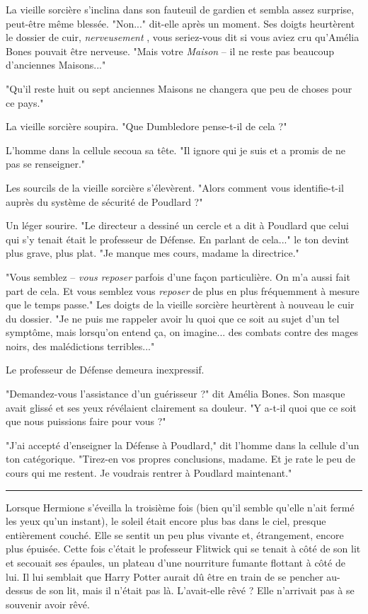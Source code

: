 La vieille sorcière s'inclina dans son fauteuil de gardien et sembla assez surprise, peut-être même blessée. "Non..." dit-elle après un moment. Ses doigts heurtèrent le dossier de cuir, \emph{nerveusement} , vous seriez-vous dit si vous aviez cru qu'Amélia Bones pouvait être nerveuse. "Mais votre \emph{Maison}  – il ne reste pas beaucoup d'anciennes Maisons..."

"Qu'il reste huit ou sept anciennes Maisons ne changera que peu de choses pour ce pays."

La vieille sorcière soupira. "Que Dumbledore pense-t-il de cela ?"

L'homme dans la cellule secoua sa tête. "Il ignore qui je suis et a promis de ne pas se renseigner."

Les sourcils de la vieille sorcière s'élevèrent. "Alors comment vous identifie-t-il auprès du système de sécurité de Poudlard ?"

Un léger sourire. "Le directeur a dessiné un cercle et a dit à Poudlard que celui qui s'y tenait était le professeur de Défense. En parlant de cela..." le ton devint plus grave, plus plat. "Je manque mes cours, madame la directrice."

"Vous semblez – \emph{vous reposer}  parfois d'une façon particulière. On m'a aussi fait part de cela. Et vous semblez vous \emph{reposer}  de plus en plus fréquemment à mesure que le temps passe." Les doigts de la vieille sorcière heurtèrent à nouveau le cuir du dossier. "Je ne puis me rappeler avoir lu quoi que ce soit au sujet d'un tel symptôme, mais lorsqu'on entend ça, on imagine... des combats contre des mages noirs, des malédictions terribles..."

Le professeur de Défense demeura inexpressif.

"Demandez-vous l'assistance d'un guérisseur ?" dit Amélia Bones. Son masque avait glissé et ses yeux révélaient clairement sa douleur. "Y a-t-il quoi que ce soit que nous puissions faire pour vous ?"

"J'ai accepté d'enseigner la Défense à Poudlard," dit l'homme dans la cellule d'un ton catégorique. "Tirez-en vos propres conclusions, madame. Et je rate le peu de cours qui me restent. Je voudrais rentrer à Poudlard maintenant."
\par\noindent\rule{\textwidth}{0.4pt}
Lorsque Hermione s'éveilla la troisième fois (bien qu'il semble qu'elle n'ait fermé les yeux qu'un instant), le soleil était encore plus bas dans le ciel, presque entièrement couché. Elle se sentit un peu plus vivante et, étrangement, encore plus épuisée. Cette fois c'était le professeur Flitwick qui se tenait à côté de son lit et secouait ses épaules, un plateau d'une nourriture fumante flottant à côté de lui. Il lui semblait que Harry Potter aurait dû être en train de se pencher au-dessus de son lit, mais il n'était pas là. L'avait-elle rêvé ? Elle n'arrivait pas à se souvenir avoir rêvé.

